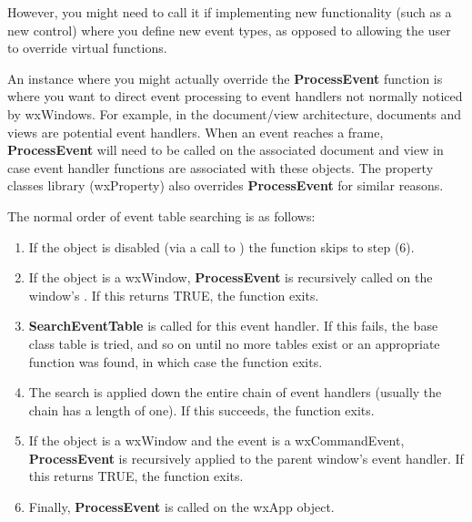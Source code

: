 However, you might need to call it if implementing new functionality (such as a new control) where
you define new event types, as opposed to allowing the user to override virtual functions.

An instance where you might actually override the {\bf ProcessEvent} function is where you want
to direct event processing to event handlers not normally noticed by wxWindows. For example,
in the document/view architecture, documents and views are potential event handlers.
When an event reaches a frame, {\bf ProcessEvent} will need to be called on the associated
document and view in case event handler functions are associated with these objects.
The property classes library (wxProperty) also overrides {\bf ProcessEvent} for similar reasons.

The normal order of event table searching is as follows:

\begin{enumerate}\itemsep=0pt
\item If the object is disabled (via a call to )
the function skips to step (6).
\item If the object is a wxWindow, {\bf ProcessEvent} is recursively called on the window's\rtfsp
{}. If this returns TRUE, the function exits.
\item {\bf SearchEventTable} is called for this event handler. If this fails, the base
class table is tried, and so on until no more tables exist or an appropriate function was found,
in which case the function exits.
\item The search is applied down the entire chain of event handlers (usually the chain has a length
of one). If this succeeds, the function exits.
\item If the object is a wxWindow and the event is a wxCommandEvent, {\bf ProcessEvent} is
recursively applied to the parent window's event handler. If this returns TRUE, the function exits.
\item Finally, {\bf ProcessEvent} is called on the wxApp object.
\end{enumerate}



\label{wxevthandlersearcheventtable}


